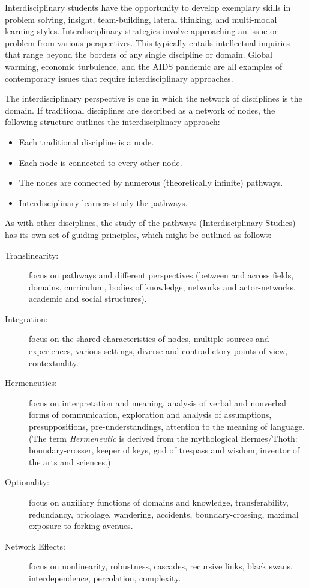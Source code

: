 \documentclass[12pt,DIV11,letterpaper,oneside,abstractoff,headsepline]{scrreprt}
\begin{document}
Interdisciplinary students have the opportunity to develop exemplary skills in problem solving, insight, team-building, lateral thinking, and multi-modal learning styles. Interdisciplinary strategies involve approaching an issue or problem from various perspectives. This typically entails intellectual inquiries that range beyond the borders of any single discipline or domain.  Global warming, economic turbulence, and the \textsc{AIDS} pandemic are all examples of contemporary issues that require interdisciplinary approaches. 

The interdisciplinary perspective is one in which the network of disciplines is the domain. If traditional disciplines are described as a network of nodes, the following structure outlines the interdisciplinary approach:
\begin{itemize}

  \item Each traditional discipline is a node.
  \item Each node is connected to every other node.
  \item The nodes are connected by numerous (theoretically infinite) pathways.
  \item Interdisciplinary learners study the pathways.
\end{itemize}

As with other disciplines, the study of the pathways (Interdisciplinary Studies) has its own set of guiding principles, which might be outlined as follows:

\begin{description}
  \item[Translinearity:] focus on pathways and different perspectives (between and across fields, domains, curriculum, bodies of knowledge, networks and actor-networks, academic and social structures).
  \item[Integration:] focus on the shared characteristics of nodes, multiple sources and experiences, various settings, diverse and contradictory points of view, contextuality.
  \item[Hermeneutics:] focus on interpretation and meaning, analysis of verbal and nonverbal forms of communication, exploration and analysis of assumptions, presuppositions, pre-understandings, attention to the meaning of language. (The term \textit{Hermeneutic} is derived from the mythological Hermes/Thoth: boundary-crosser, keeper of keys, god of trespass and wisdom, inventor of the arts and sciences.)
  \item[Optionality:] focus on auxiliary functions of domains and knowledge, transferability, redundancy, bricolage, wandering, accidents, boundary-crossing, maximal exposure to forking avenues.
  \item[Network Effects:] focus on nonlinearity, robustness, cascades, recursive links, black swans, interdependence, percolation, complexity.
\end{description}
\end{document}
